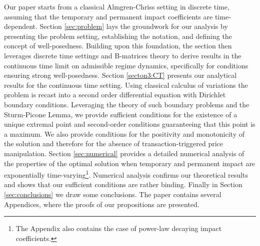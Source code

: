 \documentclass[final,3p,authoryear,12pt]{elsarticle}
\begin{document}
Our paper starts from a classical Almgren-Chriss setting in discrete time, assuming that the temporary and permanent impact coefficients are time-dependent. Section \ref{sec:problem} lays the groundwork for our analysis by presenting the problem setting, establishing the notation, and defining the concept of well-posedness. Building upon this foundation, the section then leverages discrete time settings and B-matrices theory to derive results in the continuous time limit on admissible regime dynamics, specifically for conditions ensuring strong well-posedness. Section \ref{secton3:CT} presents our analytical results for the continuous time setting. Using classical calculus of variations the problem is recast into a second order differential equation with Dirichlet boundary conditions. Leveraging the theory of such boundary problems and the Sturm-Picone Lemma, we provide sufficient conditions for the existence of a unique extremal point and second-order conditions guaranteeing that this point is a maximum. We also provide conditions for the positivity and monotonicity of the solution and therefore for the absence of transaction-triggered price manipulation. Section \ref{sec:numerical} provides a detailed numerical analysis of the properties of the optimal solution when temporary and permanent impact are exponentially time-varying\footnote{The Appendix also contains the case of power-law decaying impact coefficients.}. Numerical analysis confirms our theoretical results and shows that our sufficient conditions are rather binding. Finally in Section \ref{sec:conclusions}
we draw some conclusions. The paper contains several Appendices, where the proofs of our propositions are presented.

\end{document}
